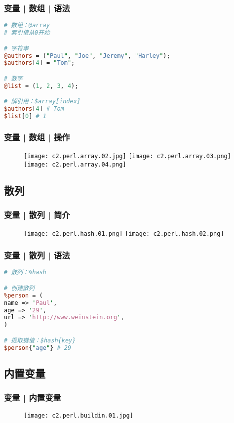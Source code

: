 \begin{frame}[fragile]
  \frametitle{变量 | 数组 | \alert{语法}}
\begin{lstlisting}[language=Perl]
# 数组：@array
# 索引值从0开始

# 字符串
@authors = ("Paul", "Joe", "Jeremy", "Harley");
$authors[4] = "Tom";

# 数字
@list = (1, 2, 3, 4);

# 解引用：$array[index]
$authors[4] # Tom
$list[0] # 1
\end{lstlisting}
\end{frame}

\begin{frame}
  \frametitle{变量 | 数组 | \alert{操作}}
  \begin{figure}
    \centering
    \texttt{[image: c2.perl.array.02.jpg]}
    \vspace{0.5cm}
    \texttt{[image: c2.perl.array.03.png]}
    \texttt{[image: c2.perl.array.04.png]}
  \end{figure}
\end{frame}

\subsection{散列}
\begin{frame}
  \frametitle{变量 | 散列 | 简介}
  \begin{figure}
    \centering
    \texttt{[image: c2.perl.hash.01.png]}\qquad
    \texttt{[image: c2.perl.hash.02.png]}
  \end{figure}
\end{frame}

\begin{frame}[fragile]
  \frametitle{变量 | 散列 | \alert{语法}}
\begin{lstlisting}[language=Perl]
# 散列：%hash

# 创建散列
%person = (
name => 'Paul',
age => '29',
url => 'http://www.weinstein.org',
)

# 提取键值：$hash{key}
$person{"age"} # 29
\end{lstlisting}
\end{frame}

\subsection{内置变量}
\begin{frame}
  \frametitle{变量 | 内置变量}
  \begin{figure}
    \centering
    \texttt{[image: c2.perl.buildin.01.jpg]}
  \end{figure}
\end{frame}

